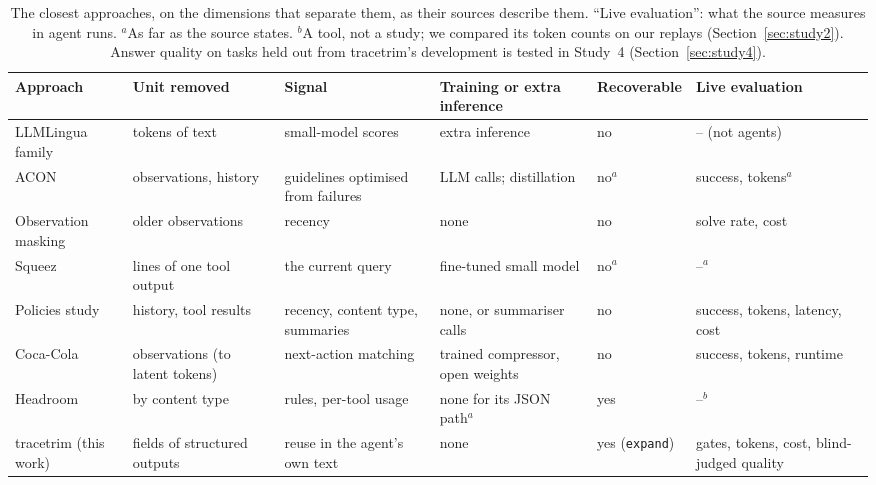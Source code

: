 \begin{table}[t]
\centering\footnotesize
\setlength{\tabcolsep}{4pt}
\begin{tabular}{>{\raggedright\arraybackslash}p{2.9cm}>{\raggedright\arraybackslash}p{2.3cm}>{\raggedright\arraybackslash}p{2.6cm}>{\raggedright\arraybackslash}p{2.6cm}>{\raggedright\arraybackslash}p{1.8cm}>{\raggedright\arraybackslash}p{2.3cm}}
\toprule
Approach & Unit removed & Signal & Training or extra inference & Recoverable & Live evaluation \\
\midrule
LLMLingua family \citep{jiang2023llmlingua,pan2024llmlingua2} & tokens of text & small-model scores & extra inference & no & -- (not agents) \\
ACON \citep{kang2026acon} & observations, history & guidelines optimised from failures & LLM calls; distillation & no$^a$ & success, tokens$^a$ \\
Observation masking \citep{lindenbauer2025complexity} & older observations & recency & none & no & solve rate, cost \\
Squeez \citep{kovacs2026squeez} & lines of one tool output & the current query & fine-tuned small model & no$^a$ & --$^a$ \\
Policies study \citep{satish2026beyond} & history, tool results & recency, content type, summaries & none, or summariser calls & no & success, tokens, latency, cost \\
Coca-Cola \citep{liu2026tools} & observations (to latent tokens) & next-action matching & trained compressor, open weights & no & success, tokens, runtime \\
Headroom \citep{headroom2026} & by content type & rules, per-tool usage & none for its JSON path$^a$ & yes & --$^b$ \\
tracetrim (this work) & fields of structured outputs & reuse in the agent's own text & none & yes (\texttt{expand}) & gates, tokens, cost, blind-judged quality \\
\bottomrule
\end{tabular}
\caption{The closest approaches, on the dimensions that separate them, as their sources describe them. ``Live
evaluation'': what the source measures in agent runs. $^a$As far as the source states. $^b$A tool, not a study; we
compared its token counts on our replays (Section~\ref{sec:study2}). Answer quality on tasks
held out from tracetrim's development is tested in Study~4 (Section~\ref{sec:study4}).}
\label{tab:related}
\end{table}

